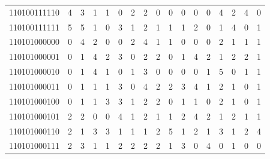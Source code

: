 \documentclass[10pt,a4paper]{article}
\begin{document}
\begin{longtable}{ |c|c|c|c|c|c|c|c|c|c|c|c|c|c|c|c|c| }
    110100111110              & 4                            & 3                                & 1                            & 1                              & 0   & 2   & 2   & 0   & 0   & 0   & 0   & 0   & 4   & 2   & 4   & 0   \\
    110100111111              & 5                            & 5                                & 1                            & 0                              & 3   & 1   & 2   & 1   & 1   & 1   & 2   & 0   & 1   & 4   & 0   & 1   \\
    110101000000              & 0                            & 4                                & 2                            & 0                              & 0   & 2   & 4   & 1   & 1   & 0   & 0   & 0   & 2   & 1   & 1   & 1   \\
    110101000001              & 0                            & 1                                & 4                            & 2                              & 3   & 0   & 2   & 2   & 0   & 1   & 4   & 2   & 1   & 2   & 2   & 1   \\
    110101000010              & 0                            & 1                                & 4                            & 1                              & 0   & 1   & 3   & 0   & 0   & 0   & 0   & 1   & 5   & 0   & 1   & 1   \\
    110101000011              & 0                            & 1                                & 1                            & 1                              & 3   & 0   & 4   & 2   & 2   & 3   & 4   & 1   & 2   & 1   & 0   & 1   \\
    110101000100              & 0                            & 1                                & 1                            & 3                              & 3   & 1   & 2   & 2   & 0   & 1   & 1   & 0   & 2   & 1   & 0   & 1   \\
    110101000101              & 2                            & 2                                & 0                            & 0                              & 4   & 1   & 2   & 1   & 1   & 2   & 4   & 2   & 1   & 2   & 1   & 1   \\
    110101000110              & 2                            & 1                                & 3                            & 3                              & 1   & 1   & 1   & 2   & 5   & 1   & 2   & 1   & 3   & 1   & 2   & 4   \\
    110101000111              & 2                            & 3                                & 1                            & 1                              & 2   & 2   & 2   & 2   & 1   & 3   & 0   & 4   & 0   & 1   & 0   & 0   \\

\end{longtable}
\end{document}
